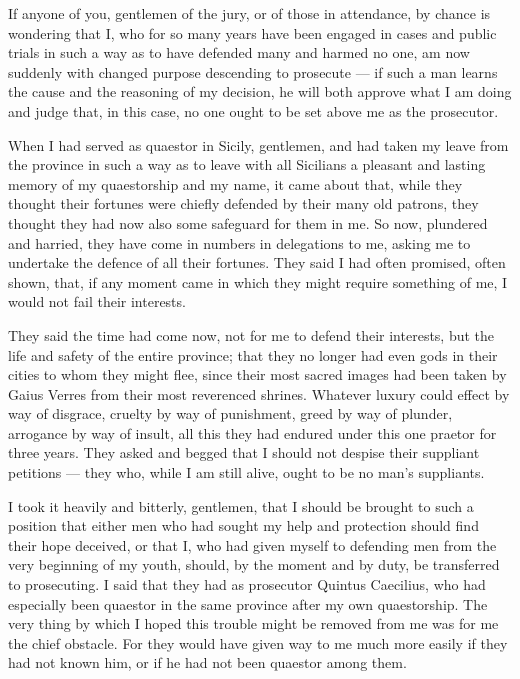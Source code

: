 
 If anyone of you, gentlemen of the jury, or of those in attendance, by chance is wondering that I, who for so many years have been engaged in cases and public trials in such a way as to have defended many and harmed no one, am now suddenly with changed purpose descending to prosecute --- if such a man learns the cause and the reasoning of my decision, he will both approve what I am doing and judge that, in this case, no one ought to be set above me as the prosecutor.

 When I had served as quaestor in Sicily, gentlemen, and had taken my leave from the province in such a way as to leave with all Sicilians a pleasant and lasting memory of my quaestorship and my name, it came about that, while they thought their fortunes were chiefly defended by their many old patrons, they thought they had now also some safeguard for them in me. So now, plundered and harried, they have come in numbers in delegations to me, asking me to undertake the defence of all their fortunes. They said I had often promised, often shown, that, if any moment came in which they might require something of me, I would not fail their interests.

 They said the time had come now, not for me to defend their interests, but the life and safety of the entire province; that they no longer had even gods in their cities to whom they might flee, since their most sacred images had been taken by Gaius Verres from their most reverenced shrines. Whatever luxury could effect by way of disgrace, cruelty by way of punishment, greed by way of plunder, arrogance by way of insult, all this they had endured under this one praetor for three years. They asked and begged that I should not despise their suppliant petitions --- they who, while I am still alive, ought to be no man's suppliants.

 I took it heavily and bitterly, gentlemen, that I should be brought to such a position that either men who had sought my help and protection should find their hope deceived, or that I, who had given myself to defending men from the very beginning of my youth, should, by the moment and by duty, be transferred to prosecuting. I said that they had as prosecutor Quintus Caecilius, who had especially been quaestor in the same province after my own quaestorship. The very thing by which I hoped this trouble might be removed from me was for me the chief obstacle. For they would have given way to me much more easily if they had not known him, or if he had not been quaestor among them.

